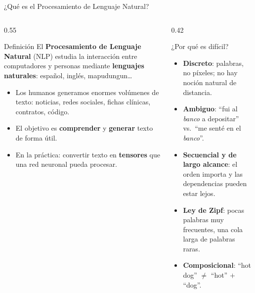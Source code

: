 \documentclass[aspectratio=169, 10pt]{beamer}
\begin{document}
\begin{frame}{¿Qu\'e es el Procesamiento de Lenguaje Natural?}

	\begin{columns}[T]
		\begin{column}{0.55\textwidth}
			\begin{block}{Definici\'on}
				El \textbf{Procesamiento de Lenguaje Natural} (NLP) estudia la interacci\'on entre computadores y personas mediante \textbf{lenguajes naturales}: espa\~nol, ingl\'es, mapudungun\ldots
			\end{block}

			\vspace{0.2cm}

			\begin{itemize}
				\item Los humanos generamos enormes vol\'umenes de texto: noticias, redes sociales, fichas cl\'inicas, contratos, c\'odigo.
				\item El objetivo es \textbf{comprender} y \textbf{generar} texto de forma \'util.
				\item En la pr\'actica: convertir texto en \textbf{tensores} que una red neuronal pueda procesar.
			\end{itemize}
		\end{column}

		\begin{column}{0.42\textwidth}
			\begin{block}{¿Por qu\'e es dif\'icil?}
				\small
				\begin{itemize}
					\item \textbf{Discreto}: palabras, no p\'ixeles; no hay noci\'on natural de distancia.
					\item \textbf{Ambiguo}: ``fui al \textit{banco} a depositar'' vs.\ ``me sent\'e en el \textit{banco}''.
					\item \textbf{Secuencial y de largo alcance}: el orden importa y las dependencias pueden estar lejos.
					\item \textbf{Ley de Zipf}: pocas palabras muy frecuentes, una cola larga de palabras raras.
					\item \textbf{Composicional}: ``hot dog'' $\neq$ ``hot'' $+$ ``dog''.
				\end{itemize}
			\end{block}
		\end{column}
	\end{columns}

\end{frame}
\end{document}
